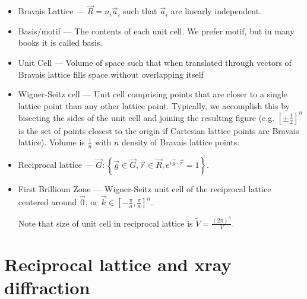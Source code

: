\documentclass[10pt]{report}
\begin{document}
\begin{itemize}
    \item Bravais Lattice --- $\vec{R} = n_i\vec{a}_i$ such that $\vec{a}_i$ are linearly independent.
    \item Basis/motif --- The contents of each unit cell. We prefer motif, but in many books it is called basis.
    \item Unit Cell --- Volume of space such that when translated through vectors of Bravais lattice fills space without overlapping itself
    \item Wigner-Seitz cell --- Unit cell comprising points that are closer to a single lattice point than any other lattice point. Typically, we accomplish this by bisecting the sides of the unit cell and joining the resulting figure (e.g. $\left[ \pm \frac{1}{2}  \right]^n$ is the set of points closest to the origin if Cartesian lattice points are Bravais lattice). Volume is $\frac{1}{n}$ with $n$ density of Bravais lattice points.
    \item Reciprocal lattice --- $\vec{G}: \left\{ \vec{g} \in \vec{G}, \vec{r} \in \vec{R}, e^{i \vec{g} \cdot \vec{r}} = 1 \right\}$.
    \item First Brillioun Zone --- Wigner-Seitz unit cell of the reciprocal lattice centered around $\vec{0}$, or $\vec{k} \in \left[ -\frac{\pi}{a}, \frac{\pi}{a} \right]^n$.

        Note that size of unit cell in reciprocal lattice is $\tilde{V} = \frac{\left( 2\pi \right)^n}{V}$.
\end{itemize}

\section{Reciprocal lattice and xray diffraction}
\end{document}
